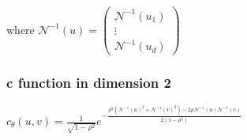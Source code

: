 \documentclass{article}
\begin{document}
	where \begin{math} \mathcal{N}^{-1}(u) =  \begin{pmatrix}
   \mathcal{N}^{-1}(u_{1}) \\
  \vdots   \\
   \mathcal{N}^{-1}(u_{d})
 \end{pmatrix}\end{math}

	\subsubsection{c function in dimension 2}
	\begin{math}
		c_\theta (u,v) = \frac{1}{\sqrt{1-\rho ^2}} e^{-\frac{\rho ^2(\mathcal{N}^{-1}(u)^2+\mathcal{N}^{-1}(v)^2) - 2 \rho \mathcal{N}^{-1}(u) \mathcal{N}^{-1}(v)}{2 (1-\rho ^2)}}
	\end{math}
\end{document}
